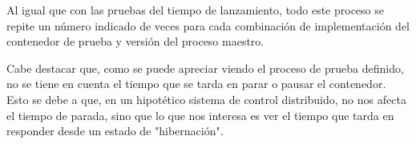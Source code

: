Al igual que con las pruebas del tiempo de lanzamiento, todo este proceso se
repite un número indicado de veces para cada combinación de implementación del
contenedor de prueba y versión del proceso maestro.

Cabe destacar que, como se puede apreciar viendo el proceso de prueba definido,
no se tiene en cuenta el tiempo que se tarda en parar o pausar el contenedor.
Esto se debe a que, en un hipotético sistema de control distribuido, no nos
afecta el tiempo de parada, sino que lo que nos interesa es ver el tiempo que
tarda en responder desde un estado de "hibernación".
